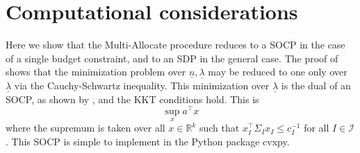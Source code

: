 \documentclass{article} %
\newcommand{\R}{\mathbb{R}}
\begin{document}
\section{Computational considerations}\label{sec:computation}

Here we show that the Multi-Allocate procedure reduces to a SOCP in the case of a single budget constraint, and to an SDP in the general case. The proof of  shows that the minimization problem over $\underline{n},\underline{\lambda}$ may be reduced to one only over $\underline{\lambda}$ via the Cauchy-Schwartz inequality. This minimization over $\underline{\lambda}$ is the dual of an SOCP, as shown by , and the KKT conditions hold. This is
\[
\sup_x a^\top x
\]
where the supremum is taken over all $x\in\R^k$ such that $x_I^\top\Sigma_Ix_I\leq c_I^{-1}$ for all $I\in\mathcal{I}$. This SOCP is simple to implement in the Python package cvxpy.
\end{document}
